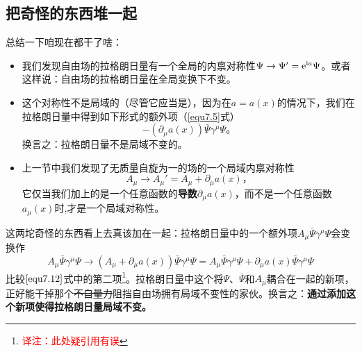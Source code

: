 \subsection{把奇怪的东西堆一起}\label{sec7.1.3}
总结一下咱现在都干了啥：
\begin{itemize}
\item 我们发现\spint 自由场的拉格朗日量有一个全局的内禀对称性$\Psi\rightarrow\Psi' = \mathrm e^{\mathrm i a}\Psi$。或者这样说：\spint 自由场的拉格朗日量在全局\uo 变换下不变。
\item 这个对称性不是局域的（尽管它应当是），因为在$a=a(x)$的情况下，我们在拉格朗日量中得到如下形式的额外项（\ref{equ7.5}式）
\begin{equation}
-(\partial_\mu a(x))\bar\Psi\gamma^\mu\Psi \text{。}
\label{equ7.12}
\end{equation}
换言之：拉格朗日量不是局域\uo 不变的。
\item 上一节中我们发现了无质量自旋为一的场的一个局域内禀对称性
\begin{equation}
A_\mu \rightarrow A_\mu' = A_\mu +\partial_\mu a(x) \text{，}
\label{equ7.13}
\end{equation}
它仅当我们加上的是一个任意函数的{\bf 导数}$\partial_\mu a(x)$，而不是一个任意函数$a_\mu(x)$时,才是一个局域对称性。
\end{itemize}
这两坨奇怪的东西看上去真该加在一起：拉格朗日量中的一个额外项$A_\mu\bar\Psi\gamma^\mu\Psi$会变换作
\begin{equation}
\label{equ7.14}
A_\mu\bar\Psi\gamma^\mu\Psi \rightarrow (A_\mu+\partial_\mu a(x))\bar\Psi\gamma^\mu\Psi = A_\mu\bar\Psi\gamma^\mu\Psi + \partial_\mu a(x)\bar\Psi\gamma^\mu\Psi
\end{equation}
比较$\ref{equ7.12}$式中的第二项\footnote{\textcolor{red}{译注：此处疑引用有误}}。拉格朗日量中这个将$\Psi$、$\bar\Psi$和$A_\mu$耦合在一起的新项，正好能干掉那个\sout{不自量力}阻挡\spint 自由场拥有局域\uo 不变性的家伙。换言之：{\bf 通过添加这个新项使得拉格朗日量局域\uo 不变。}


